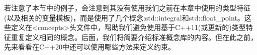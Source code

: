 若注意了本节中的例子，会注意到其没有使用我们之前在本章中使用的类型特征(以及相关的变量模板)，而是使用了几个概念:std::integral和std::float\_point。这些定义在<concepts>头文件中，帮助我们避免使用基于C++11(或更新的)类型特征重复定义相同的概念。后面，我们将简要介绍标准概念库的内容。但在此之前，先来看看在C++20中还可以使用哪些方法来定义约束。































































